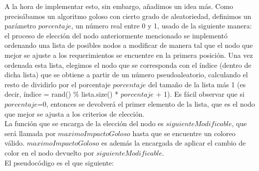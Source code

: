 A la hora de implementar esto, sin embargo, a\~nadimos un idea m\'as. Como precisábamos un algoritmo goloso con cierto grado de aleatoriedad, definimos un par\'ametro $porcentaje$, un número real entre 0 y 1, usado de la siguiente manera:
el proceso de elección del nodo anteriormente mencionado se implementó ordenando una lista de posibles nodos a modificar de manera tal que el nodo que mejor se ajuste a los requerimientos se encuentre en la primera posición. Una vez ordenada esta lista, elegimos el nodo que se corresponda con el índice (dentro de dicha lista) que se obtiene a partir de un número pseudoaleatorio, calculando el resto de dividirlo por el porcentaje $porcentaje$ del tamaño de la lista más 1 (es decir, índice = rand() \% lista.size() * $porcentaje$ + 1). Es fácil observar que si $porcentaje$=0, entonces se devolverá el primer elemento de la lista, que es el nodo que mejor se ajusta a los criterios de elección. \\

\indent La función que se encarga de la elección del nodo es $siguienteModificable$, que será llamada por $maximoImpactoGoloso$ hasta que se encuentre un coloreo válido. $maximoImpactoGoloso$ es además la encargada de aplicar el cambio de color en el nodo devuelto por $siguienteModificable$.\\

\indent El pseudocódigo es el que siguiente:\\









